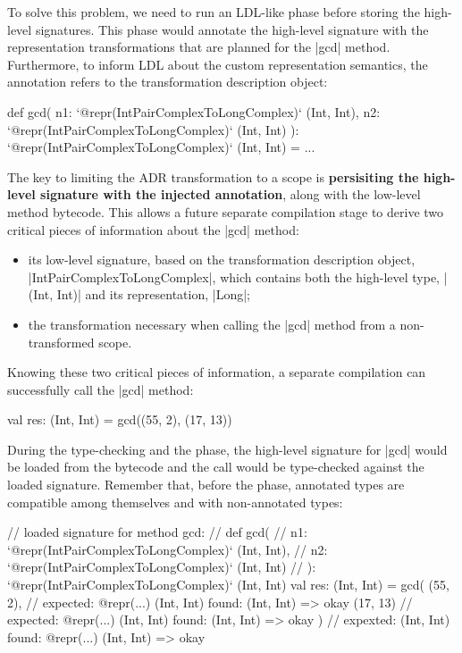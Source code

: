 To solve this problem, we need to run an LDL-like \inject{} phase before storing the high-level signatures. This phase would annotate the high-level signature with the representation transformations that are planned for the |gcd| method. Furthermore, to inform LDL about the custom representation semantics, the annotation refers to the transformation description object:

\begin{lstlisting-nobreak}
def gcd(
    n1: `@repr(IntPairComplexToLongComplex)` (Int, Int),
    n2: `@repr(IntPairComplexToLongComplex)` (Int, Int)
  ): `@repr(IntPairComplexToLongComplex)` (Int, Int) = ...
\end{lstlisting-nobreak}

The key to limiting the ADR transformation to a scope is \textbf{persisiting the high-level signature with the injected annotation}, along with the low-level method bytecode. This allows a future separate compilation stage to derive two critical pieces of information about the |gcd| method:

\begin{itemize}
  \item its low-level signature, based on the transformation description object, \\ |IntPairComplexToLongComplex|, which contains both the high-level type, |(Int, Int)| and its representation, |Long|;
  \item the transformation necessary when calling the |gcd| method from a non-transformed scope.
\end{itemize}

Knowing these two critical pieces of information, a separate compilation can successfully call the |gcd| method:

\begin{lstlisting-nobreak}
val res: (Int, Int) = gcd((55, 2), (17, 13))
\end{lstlisting-nobreak}

During the type-checking and the \inject{} phase, the high-level signature for |gcd| would be loaded from the bytecode and the call would be type-checked against the loaded signature. Remember that, before the \coerce{} phase, annotated types are compatible among themselves and with non-annotated types:

\begin{lstlisting-nobreak}
// loaded signature for method gcd:
//  def gcd(
//      n1: `@repr(IntPairComplexToLongComplex)` (Int, Int),
//      n2: `@repr(IntPairComplexToLongComplex)` (Int, Int)
//    ): `@repr(IntPairComplexToLongComplex)` (Int, Int)
val res: (Int, Int) =
  gcd(
    (55, 2),   // expected: @repr(...) (Int, Int) found: (Int, Int) => okay
    (17, 13)  // expected: @repr(...) (Int, Int) found: (Int, Int) => okay
  )             // expexted: (Int, Int) found: @repr(...) (Int, Int) => okay
\end{lstlisting-nobreak}

